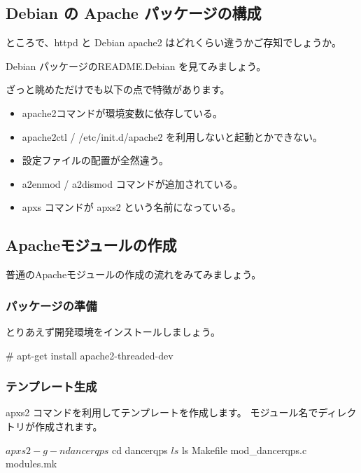 \documentclass[mingoth,a4paper]{jsarticle}
\begin{document}
\subsection{Debian の Apache パッケージの構成}

ところで、httpd と Debian apache2 はどれくらい違うかご存知でしょうか。

Debian パッケージのREADME.Debian を見てみましょう。
\cite{Apache2ReadmeDebian}

ざっと眺めただけでも以下の点で特徴があります。

\begin{itemize}
 \item  apache2コマンドが環境変数に依存している。
 \item  apache2ctl / /etc/init.d/apache2 を利用しないと起動とかできない。
 \item  設定ファイルの配置が全然違う。
 \item  a2enmod / a2dismod コマンドが追加されている。
 \item  apxs コマンドが apxs2 という名前になっている。
\end{itemize}

\subsection{Apacheモジュールの作成}

普通のApacheモジュールの作成の流れをみてみましょう。

\subsubsection{パッケージの準備}

とりあえず開発環境をインストールしましょう。
\begin{commandline}
# apt-get install apache2-threaded-dev
\end{commandline}

\subsubsection{テンプレート生成}

apxs2 コマンドを利用してテンプレートを作成します。
モジュール名でディレクトリが作成されます。

\begin{commandline}
$ apxs2 -g -n dancerqps
$ cd dancerqps
$ ls 
$ ls
Makefile  mod_dancerqps.c  modules.mk
\end{commandline}
\end{document}
